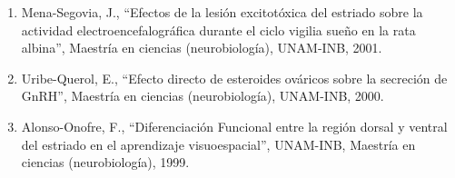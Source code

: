 \documentclass[11pt]{article}
\begin{document}
\begin{enumerate}
\item Mena-Segovia, J., “Efectos de la lesión excitotóxica del estriado sobre la actividad electroencefalográfica durante el ciclo vigilia sueño en la rata 
albina”, Maestría en ciencias (neurobiología), UNAM-INB,   2001.

\item Uribe-Querol, E., “Efecto directo de esteroides ováricos sobre la secreción de GnRH”, Maestría en ciencias (neurobiología), UNAM-INB,   2000.

\item Alonso-Onofre, F., “Diferenciación Funcional entre la región dorsal y ventral del estriado en el aprendizaje visuoespacial”, UNAM-INB, Maestría en 
ciencias 
(neurobiología),   1999.

\end{enumerate}
\end{document}
